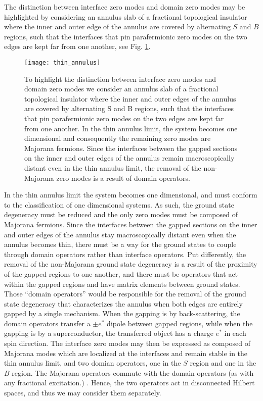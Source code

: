 \documentclass[twocolumn,aps,prb,showpacs]{revtex4-1}
\begin{document}
The distinction between interface zero modes and domain zero modes may be highlighted by considering an annulus slab of a fractional topological insulator where  the inner and outer edge of the annulus are covered by alternating $S$ and $B$ regions, such that the interfaces that pin parafermionic zero modes on the two edges are kept far from one another, see Fig. \ref{thin_annulus}.
\begin{figure}[h]
\texttt{[image: thin\_annulus]}
\caption{To highlight the distinction between   interface zero modes and domain zero modes we consider an annulus slab of a fractional topological insulator where  the inner and outer edges of the annulus are covered by alternating S and B regions, such that the interfaces that pin parafermionic zero modes on the two edges are kept far from one another. In the thin annulus limit, the system becomes one dimensional and consequently the remaining   zero modes are Majorana fermions. Since the interfaces between the gapped sections on the inner and outer edges of the annulus remain  macroscopically distant even in the thin annulus limit, the removal of the non-Majorana zero modes is  a result of  domain operators. }
\label{thin_annulus}
\end{figure}
In the thin annulus limit the system becomes one dimensional, and must conform to the classification of one dimensional systems. As such, the ground state degeneracy must be reduced and the only zero modes must be composed of Majorana fermions. \cite{Turner2011,Fidkowski2011a}
Since the interfaces between the gapped sections on the inner and outer edges of the annulus stay macroscopically distant even when the annulus becomes thin, there must be a way for the ground states to couple through domain operators rather than interface operators. Put differently,  the removal of the non-Majorana ground state degeneracy is a result of the proximity of the gapped regions to one another, and there must be operators that act within the gapped regions and have matrix elements between ground states. Those ``domain operators'' would be responsible for the removal of the ground state degeneracy that characterizes the annulus when both edges are entirely gapped by a single mechanism. When the gapping is by back-scattering, the domain operators transfer a $\pm e^*$ dipole between gapped regions, while when the gapping is by a superconductor, the transferred object has a charge $e^*$ in each spin direction. The interface zero modes may then be expressed as composed of Majorana modes which are localized at the interfaces and remain stable in the thin annulus limit,  and two domian operators, one in the $S$ region and one in the $B$ region. The Majorana operators commute with the domain operators (as with any fractional excitation.) \cite{Note1}. Hence, the two operators act in disconnected Hilbert spaces, and thus we may consider them separately.
\end{document}
